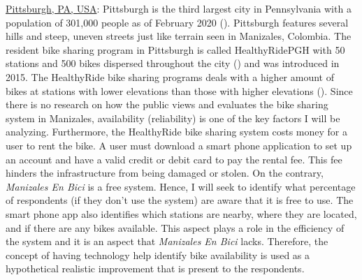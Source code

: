 \documentclass[12pt]{article}
\begin{document}
\underline{Pittsburgh, PA, USA}: Pittsburgh is the third largest city in Pennsylvania with a population of 301,000 people as of February 2020 (\cite{worldpopulationreviewPGH}). Pittsburgh features several hills and steep, uneven streets just like terrain seen in Manizales, Colombia. The resident bike sharing program in Pittsburgh is called HealthyRidePGH with 50 stations and 500 bikes dispersed throughout the city (\cite{HealthyRidePGHPSG}) and was introduced in 2015. The HealthyRide bike sharing programs deals with a higher amount of bikes at stations with lower elevations than those with higher elevations (\cite{HealthyRidePGHPSG}). Since there is no research on how the public views and evaluates the bike sharing system in Manizales, availability (reliability) is one of the key factors I will be analyzing. Furthermore, the HealthyRide bike sharing system costs money for a user to rent the bike. A user must download a smart phone application to set up an account and have a valid credit or debit card to pay the rental fee. This fee hinders the infrastructure from being damaged or stolen. On the contrary, \textit{Manizales En Bici} is a free system. Hence, I will seek to identify what percentage of respondents (if they don't use the system) are aware that it is free to use. The smart phone app also identifies which stations are nearby, where they are located, and if there are any bikes available. This aspect plays a role in the efficiency of the system and it is an aspect that \textit{Manizales En Bici} lacks. Therefore, the concept of having technology help identify bike availability is used as a hypothetical realistic improvement that is present to the respondents. 
\end{document}

